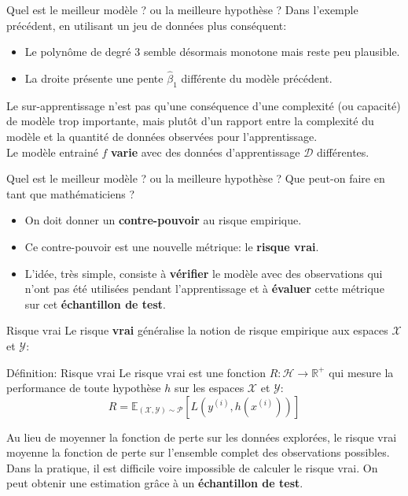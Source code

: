 \documentclass[10pt]{beamer}  %
\begin{document}
\begin{frame}{Quel est le meilleur modèle ? ou la meilleure hypothèse ?}
	Dans l'exemple précédent, en utilisant un jeu de données plus conséquent:
	\begin{itemize}
		\item Le polynôme de degré 3 semble désormais monotone mais reste peu plausible.
		\item La droite présente une pente $\hat{\beta}_1$  différente du modèle précédent. 
	\end{itemize}
	\pause
	\vspace{0.5cm}
	Le sur-apprentissage n'est pas qu'une conséquence d'une complexité (ou capacité) de modèle trop importante, mais plutôt d'un rapport entre la complexité du modèle et la quantité de données observées pour l'apprentissage. \\
	\vspace{0.5cm}
	Le modèle entrainé $\hat{f}$ \textbf{varie} avec des données d'apprentissage $\mathcal{D}$ différentes.
	\pause
\end{frame}

\begin{frame}{Quel est le meilleur modèle ? ou la meilleure hypothèse ?}
	Que peut-on faire en tant que mathématiciens ?
	\begin{itemize}
		\item On doit donner un \textbf{contre-pouvoir} au risque empirique.
		\pause
		\item Ce contre-pouvoir est une nouvelle métrique: le \textbf{risque vrai}.
		\pause
		\item L'idée, très simple, consiste à \textbf{vérifier} le modèle avec des observations qui n'ont pas été utilisées pendant l'apprentissage et à \textbf{évaluer} cette métrique sur cet \textbf{échantillon de test}. 
	\end{itemize}
\end{frame}

\begin{frame}{Risque vrai}
	Le risque \textbf{vrai} généralise la notion de risque empirique aux espaces $\mathcal{X}$ et $\mathcal{Y}$:
	\begin{block}{Définition: Risque vrai}
		Le risque vrai est une fonction $R: \mathcal{H} \to \mathbb{R}^+$ qui mesure la performance de toute hypothèse $h$ sur les espaces $\mathcal{X}$ et $\mathcal{Y}$:
		\begin{equation}
			R = \mathbb{E}_{(\mathcal{X}, \mathcal{Y}) \sim \mathcal{P}}\left[L\left(y^{(i)}, h\left(x^{(i)}\right)\right)\right]
			\nonumber
		\end{equation}
		\hfill
	\end{block}
	\pause
	Au lieu de moyenner la fonction de perte sur les données explorées, le risque vrai moyenne la fonction de perte sur l'ensemble complet des observations possibles. \\
	\pause
	Dans la pratique, il est difficile voire impossible de calculer le risque vrai. On peut obtenir une estimation grâce à un \textbf{échantillon de test}.
\end{frame}
\end{document}

